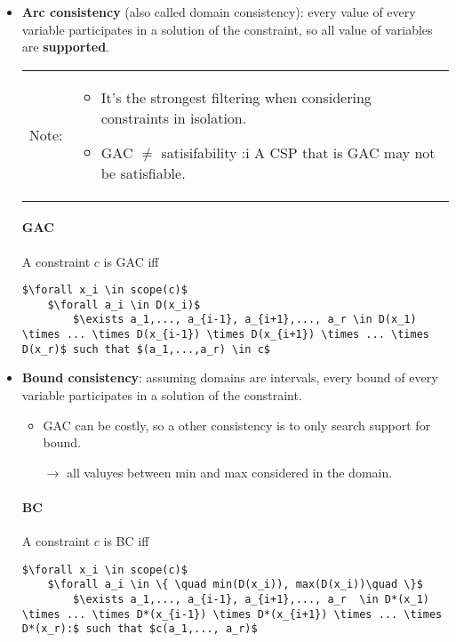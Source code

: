 \begin{itemize}
    \item \textbf{Arc consistency} (also called domain consistency):
        every value of every variable participates in a solution of the
        constraint, so all value of variables are \textbf{supported}.

        \begin{tabular}{m{1cm}m{13cm}}
            Note:&
        \begin{itemize}
            \item It's the strongest filtering when considering constraints in isolation.
                \item  GAC $\neq$ satisifability :i A CSP that is GAC may not
        be satisfiable.
        \end{itemize}
        \end{tabular}

        \paragraph{GAC} A constraint $c$ is GAC iff
        \begin{lstlisting}[mathescape]
$\forall x_i \in scope(c)$
    $\forall a_i \in D(x_i)$
        $\exists a_1,..., a_{i-1}, a_{i+1},..., a_r \in D(x_1) \times ... \times D(x_{i-1}) \times D(x_{i+1}) \times ... \times D(x_r)$ such that $(a_1,...,a_r) \in c$
        \end{lstlisting}


    \item \textbf{Bound consistency}: assuming domains are intervals,
        every bound of every variable participates in a solution of the
        constraint.

        \begin{itemize}
            \item GAC can be costly, so a other consistency is to
                only search support for bound.
            \item[$\to$] all valuyes between min and max considered in the domain.
        \end{itemize}


        \paragraph{BC} A constraint $c$ is BC iff
        \begin{lstlisting}[mathescape]
$\forall x_i \in scope(c)$
    $\forall a_i \in \{ \quad min(D(x_i)), max(D(x_i))\quad \}$
        $\exists a_1,..., a_{i-1}, a_{i+1},..., a_r  \in D*(x_1) \times ... \times D*(x_{i-1}) \times D*(x_{i+1}) \times ... \times D*(x_r):$ such that $c(a_1,..., a_r)$


\end{lstlisting}
\end{itemize}
